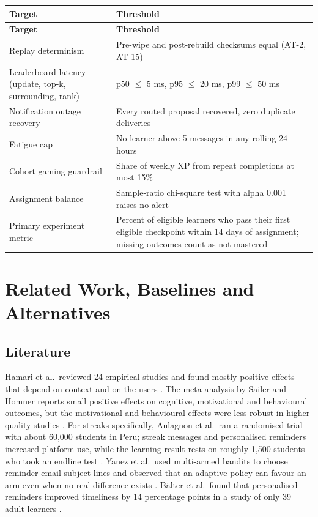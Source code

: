 \documentclass[11pt,a4paper]{article}
\newcommand{\hdr}[1]{\textbf{\color{white}\sffamily\small #1}}
\renewcommand{\_}{\textunderscore\allowbreak{}}
\begin{document}
\begin{xltabular}{\textwidth}{@{}L{4.8cm} Y@{}}
 \hdr{Target} & \hdr{Threshold} \\
\endfirsthead
{} \hdr{Target} & \hdr{Threshold} \\
\endhead
{} Replay determinism & Pre-wipe and post-rebuild checksums equal (AT-2, AT-15) \\
Leaderboard latency (update, top-k, surrounding, rank) & p50 $\le$ 5 ms, p95 $\le$ 20 ms, p99 $\le$ 50 ms \\
 Notification outage recovery & Every routed proposal recovered, zero duplicate deliveries \\
Fatigue cap & No learner above 5 messages in any rolling 24 hours \\
 Cohort gaming guardrail & Share of weekly XP from repeat completions at most 15\% \\
Assignment balance & Sample-ratio chi-square test with alpha 0.001 raises no alert \\
 Primary experiment metric & Percent of eligible learners who pass their first eligible checkpoint within 14 days of assignment; missing outcomes count as not mastered \\
\end{xltabular}

\section{Related Work, Baselines and Alternatives}
\label{sec:related}

\subsection{Literature}

Hamari et al.\ reviewed 24 empirical studies and found mostly positive effects that depend on context and on the users \cite{hamari2014}. The meta-analysis by Sailer and Homner reports small positive effects on cognitive, motivational and behavioural outcomes, but the motivational and behavioural effects were less robust in higher-quality studies \cite{sailer2020}. For streaks specifically, Aulagnon et al.\ ran a randomised trial with about 60,000 students in Peru; streak messages and personalised reminders increased platform use, while the learning result rests on roughly 1,500 students who took an endline test \cite{aulagnon2025}. Yanez et al.\ used multi-armed bandits to choose reminder-email subject lines and observed that an adaptive policy can favour an arm even when no real difference exists \cite{yanez2022}. Bälter et al.\ found that personalised reminders improved timeliness by 14 percentage points in a study of only 39 adult learners \cite{balter2023}.
\end{document}
